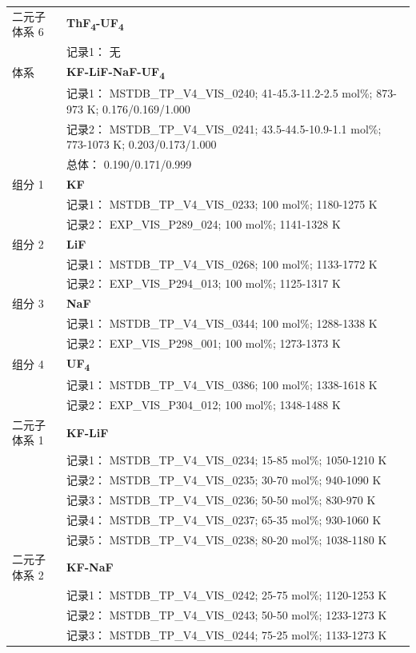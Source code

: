 \documentclass[12pt]{article}
\begin{document}
{\begin{longtable}[]{@{}
  >{\raggedright\arraybackslash}p{}
  >{\raggedright\arraybackslash}p{}@{}}
二元子体系 6 & \textbf{ThF\textsubscript{4}-UF\textsubscript{4}} \\
 & 记录1： 无 \\
\midrule
体系 & \textbf{KF-LiF-NaF-UF\textsubscript{4}} \\
 & 记录1： MSTDB\_TP\_V4\_VIS\_0240; 41-45.3-11.2-2.5 mol\%; 873-973 K; 0.176/0.169/1.000 \\
 & 记录2： MSTDB\_TP\_V4\_VIS\_0241; 43.5-44.5-10.9-1.1 mol\%; 773-1073 K; 0.203/0.173/1.000 \\
 & 总体： 0.190/0.171/0.999  \\

组分 1  & \textbf{KF} \\
 & 记录1： MSTDB\_TP\_V4\_VIS\_0233; 100 mol\%; 1180-1275 K \\
 & 记录2： EXP\_VIS\_P289\_024; 100 mol\%; 1141-1328 K  \\

组分 2  & \textbf{LiF} \\
 & 记录1： MSTDB\_TP\_V4\_VIS\_0268; 100 mol\%; 1133-1772 K \\
 & 记录2： EXP\_VIS\_P294\_013; 100 mol\%; 1125-1317 K  \\

组分 3  & \textbf{NaF} \\
 & 记录1： MSTDB\_TP\_V4\_VIS\_0344; 100 mol\%; 1288-1338 K \\
 & 记录2： EXP\_VIS\_P298\_001; 100 mol\%; 1273-1373 K  \\

组分 4  & \textbf{UF\textsubscript{4}} \\
 & 记录1： MSTDB\_TP\_V4\_VIS\_0386; 100 mol\%; 1338-1618 K \\
 & 记录2： EXP\_VIS\_P304\_012; 100 mol\%; 1348-1488 K  \\

二元子体系 1  & \textbf{KF-LiF} \\
 & 记录1： MSTDB\_TP\_V4\_VIS\_0234; 15-85 mol\%; 1050-1210 K \\
 & 记录2： MSTDB\_TP\_V4\_VIS\_0235; 30-70 mol\%; 940-1090 K \\
 & 记录3： MSTDB\_TP\_V4\_VIS\_0236; 50-50 mol\%; 830-970 K \\
 & 记录4： MSTDB\_TP\_V4\_VIS\_0237; 65-35 mol\%; 930-1060 K \\
 & 记录5： MSTDB\_TP\_V4\_VIS\_0238; 80-20 mol\%; 1038-1180 K  \\

二元子体系 2  & \textbf{KF-NaF} \\
 & 记录1： MSTDB\_TP\_V4\_VIS\_0242; 25-75 mol\%; 1120-1253 K \\
 & 记录2： MSTDB\_TP\_V4\_VIS\_0243; 50-50 mol\%; 1233-1273 K \\
 & 记录3： MSTDB\_TP\_V4\_VIS\_0244; 75-25 mol\%; 1133-1273 K  \\


\end{longtable}}
\end{document}

